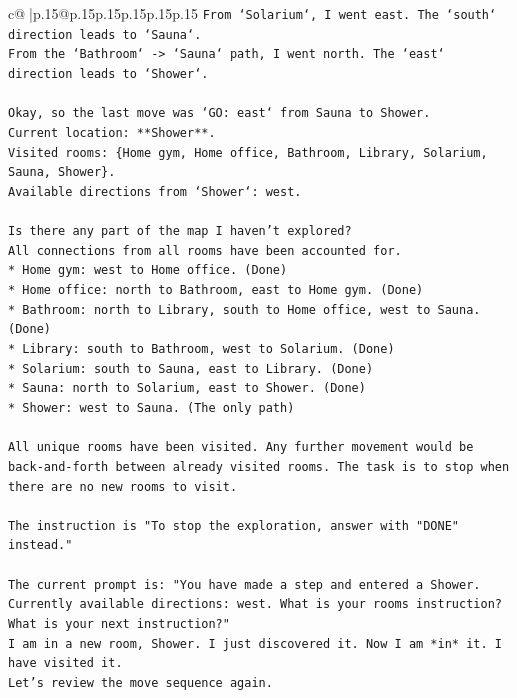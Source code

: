 \documentclass{article}
\begin{document}
{\begin{supertabular}{c@{$\;$}|p{.15\linewidth}@{}p{.15\linewidth}p{.15\linewidth}p{.15\linewidth}p{.15\linewidth}p{.15\linewidth}}
{{{\texttt{From `Solarium`, I went east. The `south` direction leads to `Sauna`.} \\
\texttt{From the `Bathroom` {-}> `Sauna` path, I went north. The `east` direction leads to `Shower`.} \\
\\ 
\texttt{Okay, so the last move was `GO: east` from Sauna to Shower.} \\
\texttt{Current location: **Shower**.} \\
\texttt{Visited rooms: \{Home gym, Home office, Bathroom, Library, Solarium, Sauna, Shower\}.} \\
\texttt{Available directions from `Shower`: west.} \\
\\ 
\texttt{Is there any part of the map I haven't explored?} \\
\texttt{All connections from all rooms have been accounted for.} \\
\texttt{*   Home gym: west to Home office. (Done)} \\
\texttt{*   Home office: north to Bathroom, east to Home gym. (Done)} \\
\texttt{*   Bathroom: north to Library, south to Home office, west to Sauna. (Done)} \\
\texttt{*   Library: south to Bathroom, west to Solarium. (Done)} \\
\texttt{*   Solarium: south to Sauna, east to Library. (Done)} \\
\texttt{*   Sauna: north to Solarium, east to Shower. (Done)} \\
\texttt{*   Shower: west to Sauna. (The only path)} \\
\\ 
\texttt{All unique rooms have been visited. Any further movement would be back{-}and{-}forth between already visited rooms. The task is to stop when there are no new rooms to visit.} \\
\\ 
\texttt{The instruction is "To stop the exploration, answer with "DONE" instead."} \\
\\ 
\texttt{The current prompt is: "You have made a step and entered a Shower. Currently available directions: west. What is your rooms instruction? What is your next instruction?"} \\
\texttt{I am in a new room, Shower. I just discovered it. Now I am *in* it. I have visited it.} \\
\texttt{Let's review the move sequence again.} \\
}}}
\end{supertabular}}
\end{document}
